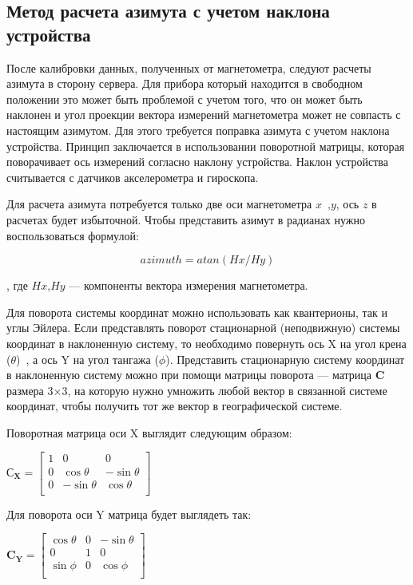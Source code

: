 \subsection{Метод расчета азимута с учетом наклона устройства}

После калибровки данных, полученных от магнетометра, следуют расчеты азимута в сторону сервера.
Для прибора который находится в свободном положении это может быть проблемой с учетом того, что
он может быть наклонен и угол проекции вектора измерений магнетометра может не совпасть с настоящим азимутом.
Для этого требуется поправка азимута с учетом наклона устройства. Принцип заключается в использовании 
поворотной матрицы, которая поворачивает ось измерений согласно наклону устройства. Наклон устройства 
считывается с датчиков акселерометра и гироскопа.

Для расчета азимута потребуется только две оси магнетометра $x$~,$y$, ось $z$ в расчетах будет избыточной.
Чтобы представить азимут в радианах нужно воспользоваться формулой:

$$ azimuth = atan(Hx/Hy)$$

, где $Hx$,$Hy$ --- компоненты вектора измерения магнетометра. 

Для поворота системы координат можно использовать как квантерионы, так и углы Эйлера.
Если представлять поворот стационарной (неподвижную) системы координат в наклоненную систему, то
необходимо повернуть ось X на угол крена ($\theta$)~, а ось Y на угол тангажа ($\phi$).
Представить стационарную систему координат в наклоненную систему можно при помощи матрицы поворота ---
матрица $\mathbf{C}$ размера 3×3, на которую нужно умножить любой вектор в связанной системе координат, 
чтобы получить тот же вектор в географической системе.

Поворотная матрица оси X выглядит следующим образом:

$\mathbf{С_X}= \begin{bmatrix} 1 & 0 & 0 \\ 
                                  0 & \cos{\theta} & -\sin{\theta} \\ 
                                  0 & -\sin{\theta} & \cos{\theta} \\ 
                  \end{bmatrix}$

Для поворота оси Y матрица будет выглядеть так:

$\mathbf{C_Y}= \begin{bmatrix} \cos{\theta} & 0 & -\sin{\theta} \\ 
    0 & 1 & 0 \\ 
    \sin{\phi} & 0 & \cos{\phi} \\ 
\end{bmatrix}$

